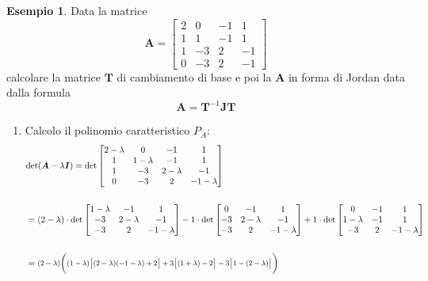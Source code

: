 \documentclass[a4paper]{article}
\renewcommand{\vec}{\bm}
\theoremstyle{definition}
\newtheorem{exmp}{Esempio}[section]
\begin{document}
			\begin{exmp}
				Data la matrice 
				\[
					\vec{A} = 
					\begin{bmatrix}
						2 & 0 & -1 & 1 \\
						1 & 1 & -1 & 1 \\
						1 & -3 & 2 & -1 \\
						0 & -3 & 2 & -1
					\end{bmatrix}
				\] 
				calcolare la matrice  $ \vec{T} $ di cambiamento di base e poi la $ \vec{A} $ in forma di Jordan data dalla formula 
				\[
					\vec{A} = \vec{T}^{-1} \vec{J} \vec{T}
				\]
				
				\begin{enumerate}
					\item Calcolo il polinomio caratteristico $ P_A $:
					\begin{align*}
						&\text{det}(\vec{A} - \lambda \vec{I}) = 
						\text{det}
						\begin{bmatrix}
							2-\lambda & 0 & -1 & 1\\
							1 & 1-\lambda & -1 & 1 \\
							1 & -3 & 2 - \lambda & -1\\
							0 & -3 & 2 & -1-\lambda
						\end{bmatrix} \\ \\
						&= (2-\lambda)\cdot\text{det}
						\begin{bmatrix}
							1-\lambda & -1 & 1\\
							-3 & 2-\lambda & -1\\
							-3 & 2 & -1-\lambda
						\end{bmatrix}
						-1\cdot\text{det}
						\begin{bmatrix}
							0 & -1 & 1 \\
							-3 & 2 - \lambda & -1\\
							-3 & 2 & -1-\lambda
						\end{bmatrix}
						+1\cdot\text{det}
						\begin{bmatrix}
							0 & -1 & 1\\
							1-\lambda & -1 & 1\\
							-3 & 2 & -1-\lambda
						\end{bmatrix} \\ \\
						&= \medmath{ (2-\lambda)\Bigg((1-\lambda)\big[ (2-\lambda)(-1-\lambda) +2 \big] 
													  + 3\big[ (1+\lambda) - 2 \big]
													  - 3\big[ 1 - (2-\lambda) \big] \Bigg)}

\end{align*}
\end{enumerate}
\end{exmp}
\end{document}
